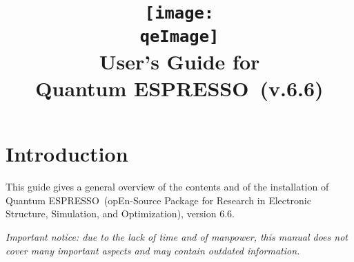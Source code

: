 \documentclass[12pt,a4paper]{article}
\def\version{6.6}
\def\qe{{\sc Quantum ESPRESSO}}
\begin{document}
\author{}
\date{}

\def\qeImage{quantum_espresso}

\title{
  \texttt{[image: \\qeImage]} \\
  \Huge User's Guide for \\ \qe\ (v.\version)
}

\maketitle

\tableofcontents

\section{Introduction}

This guide gives a general overview of the contents and of the installation
of \qe\ (opEn-Source Package for Research in Electronic Structure, Simulation,
and Optimization), version \version.

{\em Important notice: due to the lack of time and of manpower, this
  manual does not cover many important aspects and may contain outdated
  information.}
\end{document}
